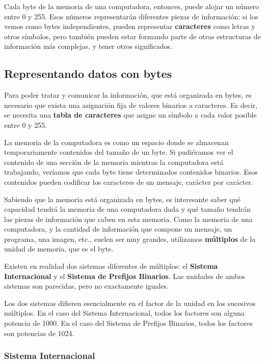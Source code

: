 \documentclass[spanish,A4,]{article}
\begin{document}
Cada byte de la memoria de una computadora, entonces, puede alojar un
número entre 0 y 255. Esos números representarán diferentes piezas de
información: si los vemos como bytes independientes, pueden representar
\textbf{caracteres} como letras y otros símbolos, pero también pueden
estar formando parte de otras estructuras de información más complejas,
y tener otros significados.

\subsection{Representando datos con
bytes}\label{representando-datos-con-bytes}

Para poder tratar y comunicar la información, que está organizada en
bytes, es necesario que exista una asignación fija de valores binarios a
caracteres. Es decir, se necesita una \textbf{tabla de caracteres} que
asigne un símbolo a cada valor posible entre 0 y 255.

La memoria de la computadora es como un espacio donde se almacenan
temporariamente contenidos del tamaño de un byte. Si pudiéramos ver el
contenido de una sección de la memoria mientras la computadora está
trabajando, veríamos que cada byte tiene determinados contenidos
binarios. Esos contenidos pueden codificar los caracteres de un mensaje,
carácter por carácter.

Sabiendo que la memoria está organizada en bytes, es interesante saber
qué capacidad tendrá la memoria de una computadora dada y qué tamaño
tendrán las piezas de información que caben en esta memoria. Como la
memoria de una computadora, y la cantidad de información que compone un
mensaje, un programa, una imagen, etc., suelen ser muy grandes,
utilizamos \textbf{múltiplos} de la unidad de memoria, que es el byte.

Existen en realidad dos sistemas diferentes de múltiplos: el
\textbf{Sistema Internacional} y el \textbf{Sistema de Prefijos
Binarios}. Las unidades de ambos sistemas son parecidas, pero no
exactamente iguales.

Los dos sistemas difieren esencialmente en el factor de la unidad en los
sucesivos múltiplos. En el caso del Sistema Internacional, todos los
factores son alguna potencia de 1000. En el caso del Sistema de Prefijos
Binarios, todos los factores son potencias de 1024.

\subsubsection{Sistema Internacional}\label{sistema-internacional}
\end{document}
